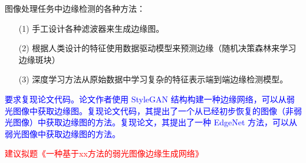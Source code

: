 \documentclass[a4paper, 10pt]{article}
\begin{document}
	图像处理任务中边缘检测的各种方法：
	
	\begin{itemize}
		\item[(1)] 
		手工设计各种滤波器来生成边缘图。
		
		\item[(2)]
		根据人类设计的特征使用数据驱动模型来预测边缘（随机决策森林来学习边缘斑块）
		
		\item[(3)]
		深度学习方法从原始数据中学习复杂的特征表示端到端边缘检测模型。
	\end{itemize}	
	
	\textcolor{blue}{要求复现论文\cite{xu2023low}代码。论文作者使用 StyleGAN 结构构建一种边缘网络，可以从弱光图像中获取边缘图。复现论文\cite{zhu2020eemefn}代码，其提出了一个从已经初步恢复的图像（非弱光图像）中获取边缘图的方法。复现论文\cite{rana2021edge}，其提出了一种 EdgeNet 方法，可以从弱光图像中获取边缘图的方法。}
	
	\textcolor{red}{建议拟题《一种基于xx方法的弱光图像边缘生成网络》}
	
	\renewcommand{\refname}{References}
	
	
		
		
		
		
		
		
	
	
	
	
	
\end{document}
